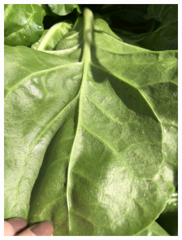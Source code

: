 \documentclass{article}
\begin{document}
\begin{figure}
\begin{subfigure}{0.4\textwidth}
        \includegraphics[width=\textwidth]{images/ds3.jpg}
    \end{subfigure}
    \begin{subfigure}{0.4\textwidth}
        \centering

\end{subfigure}
\end{figure}
\end{document}
